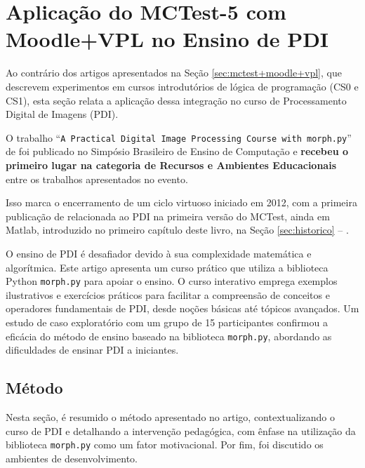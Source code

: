 \section{Aplicação do MCTest-5 com Moodle+VPL no Ensino de PDI}\label{sec:mctest+moodle+vpl+pdi}

Ao contrário dos artigos apresentados na Seção \ref{sec:mctest+moodle+vpl}, que descrevem experimentos em cursos introdutórios de lógica de programação (CS0 e CS1), esta seção relata a aplicação dessa integração no curso de Processamento Digital de Imagens (PDI).

O trabalho ``\texttt{A Practical Digital Image Processing Course with \texttt{morph.py}}'' de  foi publicado no Simpósio Brasileiro de Ensino de Computação e \textbf{recebeu o primeiro lugar na categoria de Recursos e Ambientes Educacionais} entre os trabalhos apresentados no evento.

Isso marca o encerramento de um ciclo virtuoso iniciado em 2012, com a primeira publicação de  relacionada ao PDI na primeira versão do MCTest, ainda em Matlab, introduzido no primeiro capítulo deste livro, na Seção \ref{sec:historico} -- .

O ensino de PDI é desafiador devido à sua complexidade matemática e algorítmica. Este artigo apresenta um curso prático que utiliza a biblioteca Python \texttt{morph.py} para apoiar o ensino. O curso interativo emprega exemplos ilustrativos e exercícios práticos para facilitar a compreensão de conceitos e operadores fundamentais de PDI, desde noções básicas até tópicos avançados. Um estudo de caso exploratório com um grupo de 15 participantes confirmou a eficácia do método de ensino baseado na biblioteca \texttt{morph.py}, abordando as dificuldades de ensinar PDI a iniciantes.


\subsection{Método}

Nesta seção, é resumido o método apresentado no artigo, contextualizando o curso de PDI e detalhando a intervenção pedagógica, com ênfase na utilização da biblioteca \verb|morph.py| como um fator motivacional. Por fim, foi discutido os ambientes de desenvolvimento.

